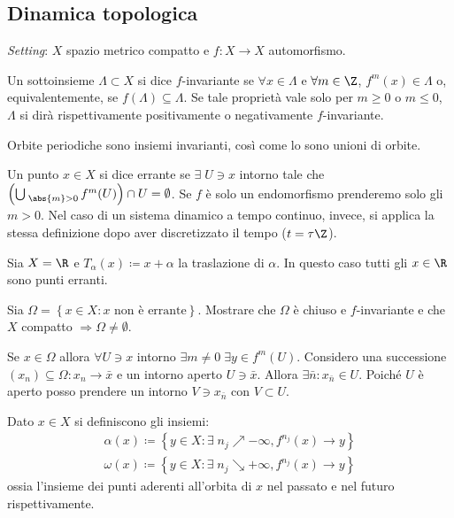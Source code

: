 \subsection{Dinamica topologica}
\emph{Setting}: $ X $ spazio metrico compatto e $ f\colon X\to X $ automorfismo.
\begin{definition}
    Un sottoinsieme $ \Lambda \subset X $ si dice $ f $-invariante se $ \forall x\in\Lambda $ e $ \forall m \in \Z $, $ f^m(x) \in \Lambda $ o, equivalentemente, se $ f(\Lambda) \subseteq \Lambda $.
    Se tale proprietà vale solo per $ m \geq 0 $ o $ m \leq 0 $, $ \Lambda $ si dirà rispettivamente positivamente o negativamente $ f $-invariante.
\end{definition}

\begin{oss}
    Orbite periodiche sono insiemi invarianti, così come lo sono unioni di orbite.
\end{oss}

\begin{definition}
    Un punto $ x\in X $ si dice errante se $ \exists\; U\ni x $ intorno tale che $ \left( \bigcup_{\; \abs{m}>0} f^m(U) \right) \cap U = \emptyset $.
    Se $ f $ è solo un endomorfismo prenderemo solo gli $ m > 0 $. Nel caso di un sistema dinamico a tempo continuo, invece, si applica la stessa definizione dopo aver discretizzato il tempo ($ t = \tau\Z $).
\end{definition}
\begin{example}
    Sia $ X = \R $ e $ T_\alpha (x) \coloneqq x + \alpha $ la traslazione di $ \alpha $. In questo caso tutti gli $ x\in\R $ sono punti erranti.
\end{example}
\begin{exercise}
    Sia $ \Omega = \left\{ x\in X : x \text{ non è errante} \right\} $. Mostrare che $ \Omega $ è chiuso e $ f $-invariante e che $ X $ compatto $ \Rightarrow \Omega \neq \emptyset $.
\end{exercise}
\begin{solution}
    Se $ x\in\Omega $ allora $ \forall U \ni x $ intorno $ \exists m \neq 0\; \exists y\in f^m(U) $. Considero una successione $ (x_n) \subseteq\Omega : x_n \to \bar x $ e un intorno aperto $ U\ni\bar x $. Allora $ \exists \bar n : x_{\bar n} \in U $. Poiché $ U $ è aperto posso prendere un intorno $ V\ni x_{\bar n} $ con $ V \subset U $.
\end{solution}

\begin{definition}
    Dato $ x\in X $ si definiscono gli insiemi:
    \begin{align*}
        \alpha(x) \coloneqq \left\{ y\in X : \exists\; n_j \nearrow -\infty, f^{n_j}(x) \to y \right\} \\
        \omega(x) \coloneqq \left\{ y\in X : \exists\; n_j \searrow +\infty, f^{n_j}(x) \to y \right\}
    \end{align*}
    ossia l'insieme dei punti aderenti all'orbita di $ x $ nel passato e nel futuro rispettivamente.
\end{definition}

